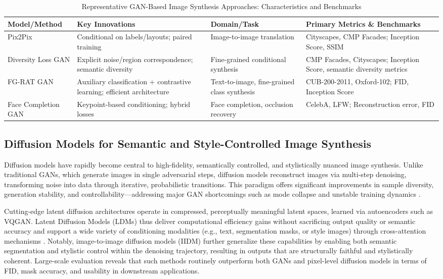 \begin{table*}[htbp]
\centering
\caption{Representative GAN-Based Image Synthesis Approaches: Characteristics and Benchmarks}
\label{tab:gan_comparison}
\begin{adjustbox}{max width=\textwidth}
\begin{tabular}{llll}
\toprule
\textbf{Model/Method} & \textbf{Key Innovations} & \textbf{Domain/Task} & \textbf{Primary Metrics \& Benchmarks} \\
\midrule
Pix2Pix & Conditional on labels/layouts; paired training & Image-to-image translation & Cityscapes, CMP Facades; Inception Score, SSIM \\
Diversity Loss GAN & Explicit noise/region correspondence; semantic diversity & Fine-grained conditional synthesis & CMP Facades, Cityscapes; Inception Score, semantic diversity metrics \\
FG-RAT GAN & Auxiliary classification + contrastive learning; efficient architecture & Text-to-image, fine-grained class synthesis & CUB-200-2011, Oxford-102; FID, Inception Score \\
Face Completion GAN & Keypoint-based conditioning; hybrid losses & Face completion, occlusion recovery & CelebA, LFW; Reconstruction error, FID \\
\bottomrule
\end{tabular}
\end{adjustbox}
\end{table*}

\subsection{Diffusion Models for Semantic and Style-Controlled Image Synthesis}

Diffusion models have rapidly become central to high-fidelity, semantically controlled, and stylistically nuanced image synthesis. Unlike traditional GANs, which generate images in single adversarial steps, diffusion models reconstruct images via multi-step denoising, transforming noise into data through iterative, probabilistic transitions. This paradigm offers significant improvements in sample diversity, generation stability, and controllability—addressing major GAN shortcomings such as mode collapse and unstable training dynamics \cite{ref76,ref90}.

Cutting-edge latent diffusion architectures operate in compressed, perceptually meaningful latent spaces, learned via autoencoders such as VQGAN. Latent Diffusion Models (LDMs) thus deliver computational efficiency gains without sacrificing output quality or semantic accuracy and support a wide variety of conditioning modalities (e.g., text, segmentation masks, or style images) through cross-attention mechanisms \cite{ref73,ref76,ref90,ref102}. Notably, image-to-image diffusion models (IIDM) further generalize these capabilities by enabling both semantic segmentation and stylistic control within the denoising trajectory, resulting in outputs that are structurally faithful and stylistically coherent. Large-scale evaluation reveals that such methods routinely outperform both GANs and pixel-level diffusion models in terms of FID, mask accuracy, and usability in downstream applications.

